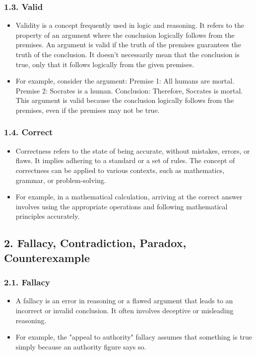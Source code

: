 \documentclass{article}
\begin{document}
\subsubsection*{1.3. Valid}
\begin{itemize}
\item Validity is a concept frequently used in logic and reasoning. It refers to the property of an argument where the conclusion logically follows from the premises. An argument is valid if the truth of the premises guarantees the truth of the conclusion. It doesn't necessarily mean that the conclusion is true, only that it follows logically from the given premises.
\item For example, consider the argument:
Premise 1: All humans are mortal.
Premise 2: Socrates is a human.
Conclusion: Therefore, Socrates is mortal.
This argument is valid because the conclusion logically follows from the premises, even if the premises may not be true.
\end{itemize}
\subsubsection*{1.4. Correct}
\begin{itemize}
\item Correctness refers to the state of being accurate, without mistakes, errors, or flaws. It implies adhering to a standard or a set of rules. The concept of correctness can be applied to various contexts, such as mathematics, grammar, or problem-solving.
\item For example, in a mathematical calculation, arriving at the correct answer involves using the appropriate operations and following mathematical principles accurately.
\end{itemize}
\subsection*{2. Fallacy, Contradiction, Paradox, Counterexample}
\subsubsection*{2.1. Fallacy}
\begin{itemize}
\item A fallacy is an error in reasoning or a flawed argument that leads to an incorrect or invalid conclusion. It often involves deceptive or misleading reasoning.
\item For example, the "appeal to authority" fallacy assumes that something is true simply because an authority figure says so.
\end{itemize}
\end{document}
